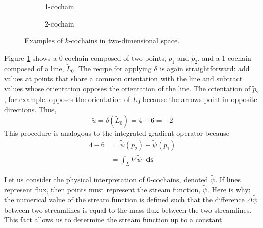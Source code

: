 \begin{figure}[ht]
\begin{subfigure}[c]{0.3\textwidth}
{
            \vfill
        }
        \caption{1-cochain}
        \label{fig:outer1CochainExample}
    \end{subfigure}
    \begin{subfigure}[c]{0.3\textwidth}
        \centering
        \usebox{\boxOuterExample}
        \caption{2-cochain}
        \label{fig:outer2CochainExample}
    \end{subfigure}
    \caption{Examples of $k$-cochains in two-dimensional space.}
    \label{fig:outerCochainExamples}
\end{figure}

Figure \ref{fig:outer1CochainExample} shows a 0-cochain composed of two points, $\tilde{p}_1$ and $\tilde{p}_2$, and a 1-cochain composed of a line, $\tilde{L}_0$. The recipe for applying $\delta$ is again  straightforward: add values at points that share a common orientation with the line and subtract values whose orientation opposes the orientation of the line. The orientation of $\tilde{p}_2$, for example, opposes the orientation of $\tilde{L}_0$ because the arrows point in opposite directions. Thus,\begin{equation}
    \tilde{u} = \delta(\tilde{L}_0) = 4 - 6 = -2
\end{equation}
This procedure is analogous to the integrated gradient operator because
\begin{equation}
    \begin{split}
        4 - 6 &= \tilde{\psi}(p_2) - \tilde{\psi}(p_1) \\
        &= \int_{L} \nabla \tilde{\psi} \cdot \mathbf{ds}
    \end{split}
\end{equation}

Let us consider the physical interpretation of 0-cochains, denoted $\tilde{\psi}$. If lines represent flux, then points must represent the stream function, $\tilde{\psi}$. Here is why: the numerical value of the stream function is defined such that the difference $\Delta \tilde{\psi}$ between two streamlines is equal to the mass flux between the two streamlines. This fact allows us to determine the stream function up to a constant.

